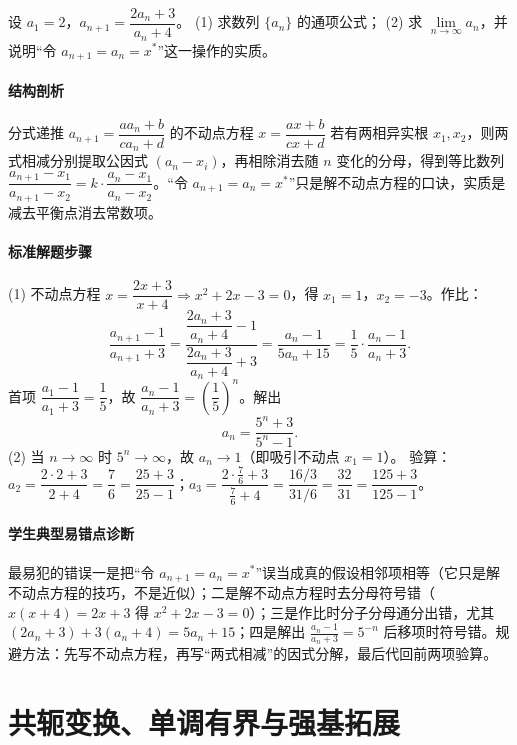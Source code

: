 \begin{problem}
设 $a_1=2$，$a_{n+1}=\dfrac{2a_n+3}{a_n+4}$。
(1) 求数列 $\{a_n\}$ 的通项公式；
(2) 求 $\lim\limits_{n\to\infty}a_n$，并说明“令 $a_{n+1}=a_n=x^*$”这一操作的实质。
\end{problem}
\begin{solution}
\paragraph{结构剖析}
分式递推 $a_{n+1}=\dfrac{aa_n+b}{ca_n+d}$ 的不动点方程 $x=\dfrac{ax+b}{cx+d}$ 若有两相异实根 $x_1,x_2$，则两式相减分别提取公因式 $(a_n-x_i)$，再相除消去随 $n$ 变化的分母，得到等比数列 $\dfrac{a_{n+1}-x_1}{a_{n+1}-x_2}=k\cdot\dfrac{a_n-x_1}{a_n-x_2}$。“令 $a_{n+1}=a_n=x^*$”只是解不动点方程的口诀，实质是减去平衡点消去常数项。
\paragraph{标准解题步骤}
(1) 不动点方程 $x=\dfrac{2x+3}{x+4}\Rightarrow x^2+2x-3=0$，得 $x_1=1$，$x_2=-3$。作比：
$$\frac{a_{n+1}-1}{a_{n+1}+3}
=\frac{\dfrac{2a_n+3}{a_n+4}-1}{\dfrac{2a_n+3}{a_n+4}+3}
=\frac{a_n-1}{5a_n+15}=\frac15\cdot\frac{a_n-1}{a_n+3}.$$
首项 $\dfrac{a_1-1}{a_1+3}=\dfrac15$，故 $\dfrac{a_n-1}{a_n+3}=\left(\dfrac15\right)^n$。解出
$$a_n=\frac{5^n+3}{5^n-1}.$$
(2) 当 $n\to\infty$ 时 $5^n\to\infty$，故 $a_n\to1$（即吸引不动点 $x_1=1$）。
验算：$a_2=\dfrac{2\cdot2+3}{2+4}=\dfrac76=\dfrac{25+3}{25-1}$；$a_3=\dfrac{2\cdot\frac76+3}{\frac76+4}=\dfrac{16/3}{31/6}=\dfrac{32}{31}=\dfrac{125+3}{125-1}$。
\paragraph{学生典型易错点诊断}
最易犯的错误一是把“令 $a_{n+1}=a_n=x^*$”误当成真的假设相邻项相等（它只是解不动点方程的技巧，不是近似）；二是解不动点方程时去分母符号错（$x(x+4)=2x+3$ 得 $x^2+2x-3=0$）；三是作比时分子分母通分出错，尤其 $(2a_n+3)+3(a_n+4)=5a_n+15$；四是解出 $\frac{a_n-1}{a_n+3}=5^{-n}$ 后移项时符号错。规避方法：先写不动点方程，再写“两式相减”的因式分解，最后代回前两项验算。
\end{solution}

\section{共轭变换、单调有界与强基拓展}

